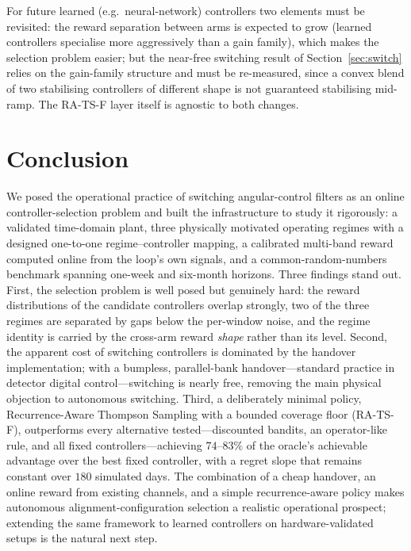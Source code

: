 \documentclass[11pt,a4paper]{article}
\begin{document}
For future learned (e.g.\ neural-network) controllers two elements must be
revisited: the reward separation between arms is expected to grow (learned
controllers specialise more aggressively than a gain family), which makes the
selection problem easier; but the near-free switching result of
Section~\ref{sec:switch} relies on the gain-family structure and must be
re-measured, since a convex blend of two stabilising controllers of different
shape is not guaranteed stabilising mid-ramp. The RA-TS-F layer itself is
agnostic to both changes.

\section{Conclusion}\label{sec:conclusion}
We posed the operational practice of switching angular-control filters as an
online controller-selection problem and built the infrastructure to study it
rigorously: a validated time-domain plant, three physically motivated operating
regimes with a designed one-to-one regime--controller mapping, a calibrated
multi-band reward computed online from the loop's own signals, and a
common-random-numbers benchmark spanning one-week and six-month horizons. Three
findings stand out. First, the selection problem is well posed but genuinely
hard: the reward distributions of the candidate controllers overlap strongly,
two of the three regimes are separated by gaps below the per-window noise, and
the regime identity is carried by the cross-arm reward \emph{shape} rather than
its level. Second, the apparent cost of switching controllers is dominated by
the handover implementation; with a bumpless, parallel-bank handover---standard
practice in detector digital control---switching is nearly free, removing the
main physical objection to autonomous switching. Third, a deliberately minimal
policy, Recurrence-Aware Thompson Sampling with a bounded coverage floor
(RA-TS-F), outperforms every alternative tested---discounted bandits, an
operator-like rule, and all fixed controllers---achieving $74$--$83\%$ of the oracle's
achievable advantage over the best fixed controller, with a regret slope that
remains constant over $180$ simulated days. The combination of a cheap
handover, an online reward from existing channels, and a simple
recurrence-aware policy makes autonomous alignment-configuration selection a
realistic operational prospect; extending the same framework to learned
controllers on hardware-validated setups is the natural next step.
\end{document}
